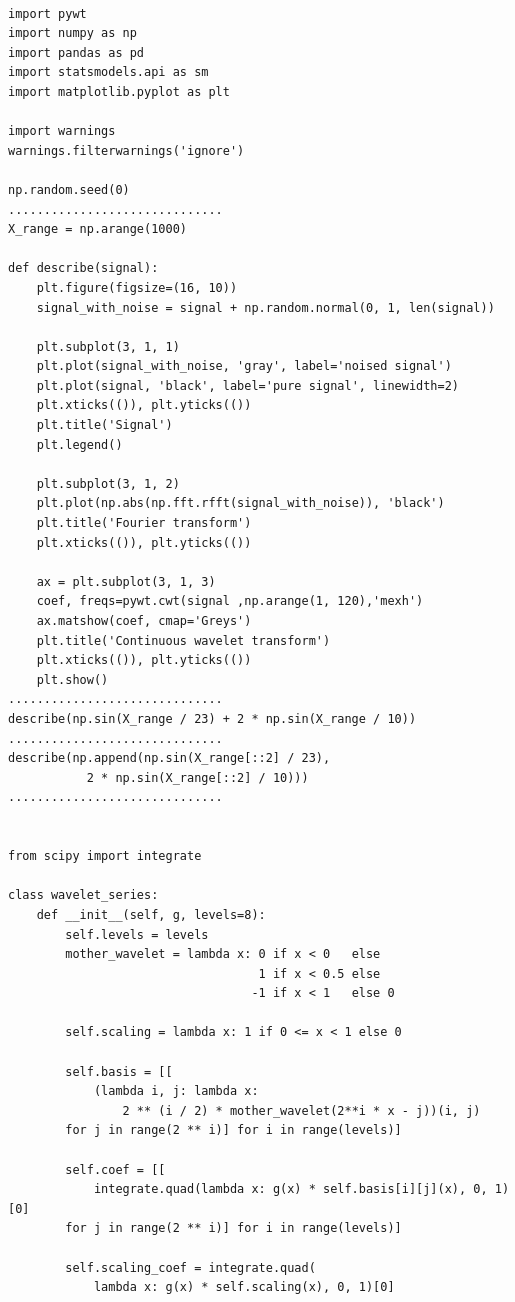 \documentclass[a4paper]{article}
\begin{document}
	\begin{lstlisting}[inputencoding={utf8}]

import pywt
import numpy as np
import pandas as pd
import statsmodels.api as sm
import matplotlib.pyplot as plt

import warnings
warnings.filterwarnings('ignore')

np.random.seed(0)
..............................
X_range = np.arange(1000)      

def describe(signal):
    plt.figure(figsize=(16, 10))
    signal_with_noise = signal + np.random.normal(0, 1, len(signal))

    plt.subplot(3, 1, 1)
    plt.plot(signal_with_noise, 'gray', label='noised signal')
    plt.plot(signal, 'black', label='pure signal', linewidth=2)
    plt.xticks(()), plt.yticks(())
    plt.title('Signal')
    plt.legend()

    plt.subplot(3, 1, 2)
    plt.plot(np.abs(np.fft.rfft(signal_with_noise)), 'black')
    plt.title('Fourier transform')
    plt.xticks(()), plt.yticks(())

    ax = plt.subplot(3, 1, 3)
    coef, freqs=pywt.cwt(signal ,np.arange(1, 120),'mexh')
    ax.matshow(coef, cmap='Greys')
    plt.title('Continuous wavelet transform')
    plt.xticks(()), plt.yticks(())
    plt.show()
..............................
describe(np.sin(X_range / 23) + 2 * np.sin(X_range / 10))
..............................
describe(np.append(np.sin(X_range[::2] / 23),
	       2 * np.sin(X_range[::2] / 10)))
..............................


from scipy import integrate

class wavelet_series:
    def __init__(self, g, levels=8):
        self.levels = levels
        mother_wavelet = lambda x: 0 if x < 0   else
                                   1 if x < 0.5 else
                                  -1 if x < 1   else 0

        self.scaling = lambda x: 1 if 0 <= x < 1 else 0

        self.basis = [[
            (lambda i, j: lambda x:
                2 ** (i / 2) * mother_wavelet(2**i * x - j))(i, j)
        for j in range(2 ** i)] for i in range(levels)]

        self.coef = [[
            integrate.quad(lambda x: g(x) * self.basis[i][j](x), 0, 1)[0] 
        for j in range(2 ** i)] for i in range(levels)]

        self.scaling_coef = integrate.quad(
            lambda x: g(x) * self.scaling(x), 0, 1)[0]


\end{lstlisting}
\end{document}
